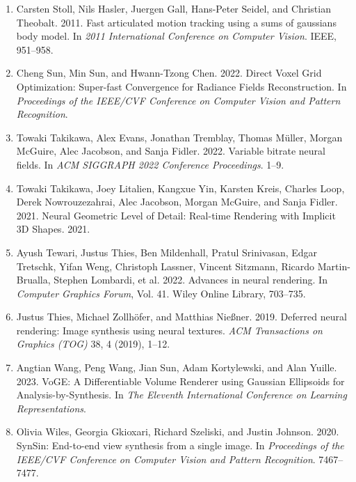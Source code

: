 \begin{enumerate}[leftmargin=2em, itemsep=0.3em, topsep=0.4em, parsep=0pt]
    \item Carsten Stoll, Nils Hasler, Juergen Gall, Hans-Peter Seidel, and Christian Theobalt. 2011. Fast articulated motion tracking using a sums of gaussians body model. In \textit{2011 International Conference on Computer Vision}. IEEE, 951--958.

    \item Cheng Sun, Min Sun, and Hwann-Tzong Chen. 2022. Direct Voxel Grid Optimization: Super-fast Convergence for Radiance Fields Reconstruction. In \textit{Proceedings of the IEEE/CVF Conference on Computer Vision and Pattern Recognition}.

    \item Towaki Takikawa, Alex Evans, Jonathan Tremblay, Thomas M{\"u}ller, Morgan McGuire, Alec Jacobson, and Sanja Fidler. 2022. Variable bitrate neural fields. In \textit{ACM SIGGRAPH 2022 Conference Proceedings}. 1--9.

    \item Towaki Takikawa, Joey Litalien, Kangxue Yin, Karsten Kreis, Charles Loop, Derek Nowrouzezahrai, Alec Jacobson, Morgan McGuire, and Sanja Fidler. 2021. Neural Geometric Level of Detail: Real-time Rendering with Implicit 3D Shapes. 2021.

    \item Ayush Tewari, Justus Thies, Ben Mildenhall, Pratul Srinivasan, Edgar Tretschk, Yifan Weng, Christoph Lassner, Vincent Sitzmann, Ricardo Martin-Brualla, Stephen Lombardi, et al. 2022. Advances in neural rendering. In \textit{Computer Graphics Forum}, Vol. 41. Wiley Online Library, 703--735.

    \item Justus Thies, Michael Zollh{\"o}fer, and Matthias Nie{\ss}ner. 2019. Deferred neural rendering: Image synthesis using neural textures. \textit{ACM Transactions on Graphics (TOG)} 38, 4 (2019), 1--12.

    \item Angtian Wang, Peng Wang, Jian Sun, Adam Kortylewski, and Alan Yuille. 2023. VoGE: A Differentiable Volume Renderer using Gaussian Ellipsoids for Analysis-by-Synthesis. In \textit{The Eleventh International Conference on Learning Representations}.

    \item Olivia Wiles, Georgia Gkioxari, Richard Szeliski, and Justin Johnson. 2020. SynSin: End-to-end view synthesis from a single image. In \textit{Proceedings of the IEEE/CVF Conference on Computer Vision and Pattern Recognition}. 7467--7477.


\end{enumerate}

